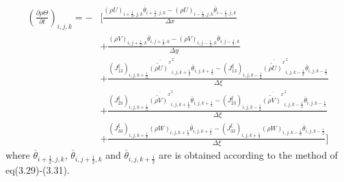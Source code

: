 \begin{align}
 \left(\frac{\partial \rho \Theta}{\partial t}\right)_{i,j,k}
 = - &\Bigg[ \frac{ (\rho U)_{i+\frac{1}{2},j,k} \overline{\theta}_{i+\frac{1}{2},j,k}
                  - (\rho U)_{i-\frac{1}{2},j,k} \overline{\theta}_{i-\frac{1}{2},j,k}
                  } {\Delta x} \nonumber \\
          &+ \frac{ (\rho V)_{i,j+\frac{1}{2},k} \overline{\theta}_{i,j+\frac{1}{2},k}
                  - (\rho V)_{i,j-\frac{1}{2},k} \overline{\theta}_{i,j-\frac{1}{2},k}
                  } {\Delta y} \nonumber \\
          &+ \frac{ (J^{\xi}_{13})_{i,j,k+\frac{1}{2}} \overline{\widetilde{(\rho U)}^x}^z_{i,j,k+\frac{1}{2}} \overline{\theta}_{i,j,k+\frac{1}{2}}
                  - (J^{\xi}_{13})_{i,j,k-\frac{1}{2}} \overline{\widetilde{(\rho U)}^x}^z_{i,j,k-\frac{1}{2}} \overline{\theta}_{i,j,k-\frac{1}{2}}
                  } {\Delta \xi} \nonumber \\
          &+ \frac{ (J^{\xi}_{23})_{i,j,k+\frac{1}{2}} \overline{\widetilde{(\rho V)}^x}^z_{i,j,k+\frac{1}{2}} \overline{\theta}_{i,j,k+\frac{1}{2}}
                  - (J^{\xi}_{23})_{i,j,k-\frac{1}{2}} \overline{\widetilde{(\rho V)}^x}^z_{i,j,k-\frac{1}{2}} \overline{\theta}_{i,j,k-\frac{1}{2}}
                  } {\Delta \xi} \nonumber \\
          &+ \frac{ (J^{\xi}_{33})_{i,j,k+\frac{1}{2}} (\rho W)_{i,j,k+\frac{1}{2}} \overline{\theta}_{i,j,k+\frac{1}{2}}
                  - (J^{\xi}_{33})_{i,j,k+\frac{1}{2}} (\rho W)_{i,j,k-\frac{1}{2}} \overline{\theta}_{i,j,k-\frac{1}{2}}
                  } {\Delta \xi} \Bigg]
\end{align}
where $\overline{\theta}_{i+\frac{1}{2},j,k}$, $\overline{\theta}_{i,j+\frac{1}{2},k}$ and 
$\overline{\theta}_{i,j,k+\frac{1}{2}}$ are is obtained according to the method of eq(3.29)-(3.31).
